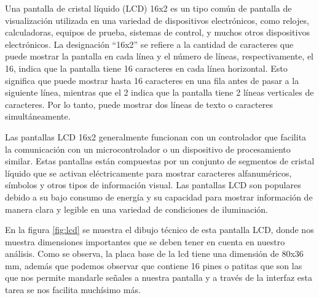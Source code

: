     Una pantalla de cristal líquido (LCD) 16x2 es un tipo común de pantalla de visualización utilizada en una variedad de dispositivos electrónicos, como relojes, calculadoras, equipos de prueba, sistemas de control, y muchos otros dispositivos electrónicos. La designación “16x2” se refiere a la cantidad de caracteres que puede mostrar la pantalla en cada línea y el número de líneas, respectivamente, el 16, indica que la pantalla tiene 16 caracteres en cada línea horizontal. Esto significa que puede mostrar hasta 16 caracteres en una fila antes de pasar a la siguiente línea, mientras que el 2 indica que la pantalla tiene 2 líneas verticales de caracteres. Por lo tanto, puede mostrar dos líneas de texto o caracteres simultáneamente.
    
    Las pantallas LCD 16x2 generalmente funcionan con un controlador que facilita la comunicación con un microcontrolador o un dispositivo de procesamiento similar. Estas pantallas están compuestas por un conjunto de segmentos de cristal líquido que se activan eléctricamente para mostrar caracteres alfanuméricos, símbolos y otros tipos de información visual. Las pantallas LCD son populares debido a su bajo consumo de energía y su capacidad para mostrar información de manera clara y legible en una variedad de condiciones de iluminación.
    
    En la figura \ref{fig:lcd} se muestra el dibujo técnico de esta pantalla LCD, donde nos muestra dimensiones importantes que se deben tener en cuenta en nuestro análisis. Como se observa, la placa base de la lcd tiene una dimensión de 80x36 mm, además que podemos observar que contiene 16 pines o patitas que son las que nos permite mandarle señales a nuestra pantalla y a través de la interfaz esta tarea se nos facilita muchísimo más.
    
